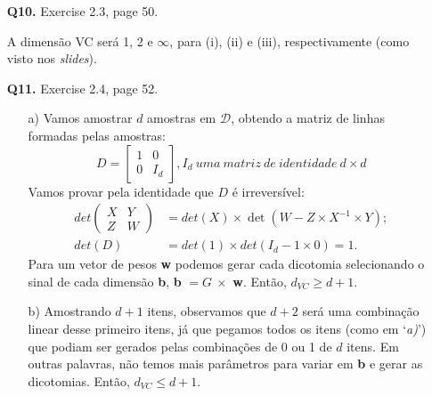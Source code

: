 \documentclass[12pt]{article}
\begin{document}
\begin{enumerate}
\item [\textbf{Q10.}] Exercise 2.3, page 50.
	\begin{addmargin}[1em]{2em}
		A dimensão VC será 1, 2 e $\infty$, para (i), (ii) e (iii), respectivamente (como visto nos \textit{slides}).
	\end{addmargin}
\item [\textbf{Q11.}] Exercise 2.4, page 52.
	\begin{addmargin}[1em]{2em}
		\begin{itemize}
			\item[a)] Vamos amostrar $d$ amostras em $\mathcal{D}$, obtendo a matriz de linhas formadas pelas amostras: \[D = \begin{bmatrix} 1 & 0 \\ 0 & I_d	\end{bmatrix}, I_d\ uma\ matriz\ de \ identidade\ d \times d\]
			Vamos provar pela identidade que $D$ é irreversível: 
			\begin{align*}
				det \begin{pmatrix} X & Y \\ Z & W	\end{pmatrix} & = det(X) \times \det(W-Z \times X^{-1} \times Y);\\
				det(D) & = det(1) \times det(I_d - 1 \times 0) = 1. 
			\end{align*}
			Para um vetor de pesos \textbf{w} podemos gerar cada dicotomia selecionando o sinal de cada dimensão \textbf{b}, \textbf{b} $ = G\ \times$ \textbf{w}. Então, $d_{VC} \geq d + 1$.
			\item[b)] Amostrando $d + 1$ itens, observamos que $d + 2$ será uma combinação linear desse primeiro itens, já que pegamos todos os itens (como em `\textit{a)}') que podiam ser gerados pelas combinações de 0 ou 1 de $d$ itens. Em outras palavras, não temos mais parâmetros para variar em \textbf{b} e gerar as dicotomias. Então, $d_{VC} \leq d + 1$.
		\end{itemize}
	\end{addmargin}


\end{enumerate}
\end{document}
